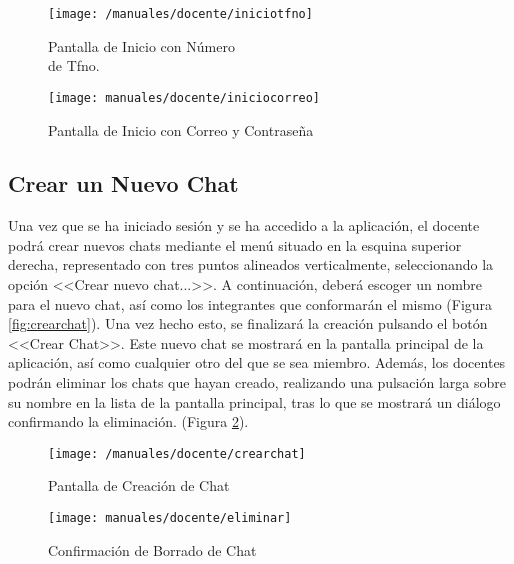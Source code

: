 \begin{figure}[!h]
	\centering
	\begin{minipage}{.5\textwidth}
		\centering
		\texttt{[image: /manuales/docente/iniciotfno]}
		\caption{Pantalla de Inicio con Número \\ de Tfno.}
		\label{fig:iniciotfnodocente}
	\end{minipage}%
	\begin{minipage}{.5\textwidth}
		\centering
		\texttt{[image: manuales/docente/iniciocorreo]}
		\caption{Pantalla de Inicio con Correo y Contraseña}
		\label{fig:iniciocorreodocente}
	\end{minipage}
\end{figure}

\clearpage

\subsection*{Crear un Nuevo Chat}
Una vez que se ha iniciado sesión y se ha accedido a la aplicación, el docente podrá crear nuevos chats mediante el menú situado en la esquina superior derecha, representado con tres puntos alineados verticalmente, seleccionando la opción <<Crear nuevo chat...>>. A continuación, deberá escoger un nombre para el nuevo chat, así como los integrantes que conformarán el mismo (Figura \ref{fig:crearchat}). Una vez hecho esto, se finalizará la creación pulsando el botón <<Crear Chat>>. Este nuevo chat se mostrará en la pantalla principal de la aplicación, así como cualquier otro del que se sea miembro. Además, los docentes podrán eliminar los chats que hayan creado, realizando una pulsación larga sobre su nombre en la lista de la pantalla principal, tras lo que se mostrará un diálogo confirmando la eliminación. (Figura \ref{fig:eliminarchat}).

\begin{figure}[!h]
	\centering
	\begin{minipage}{.5\textwidth}
		\centering
		\texttt{[image: /manuales/docente/crearchat]}
		\caption{Pantalla de Creación de Chat}
		\label{fig:crearchat}
	\end{minipage}%
	\begin{minipage}{.5\textwidth}
		\centering
		\texttt{[image: manuales/docente/eliminar]}
		\caption{Confirmación de Borrado de Chat}
		\label{fig:eliminarchat}
	\end{minipage}
\end{figure}

